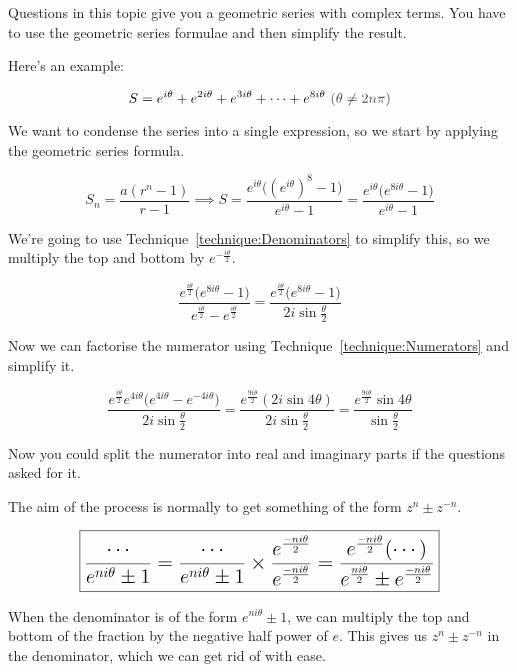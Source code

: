 \documentclass[../main.tex]{subfile}
\begin{document}

Questions in this topic give you a geometric series with complex terms. You have to use the geometric series formulae and then simplify the result.

Here's an example:

$$S = e^{i\theta} + e^{2i\theta} + e^{3i\theta} + \cdots + e^{8i\theta}\ \constraint{\theta \ne 2n\pi}$$

We want to condense the series into a single expression, so we start by applying the geometric series formula.

$$S_n = \dfrac{a(r^n - 1)}{r - 1}
\implies S = \frac{e^{i\theta} \big( (e^{i\theta})^8 - 1 \big)}{e^{i\theta} - 1}
= \frac{e^{i\theta} \big( e^{8i\theta} - 1 \big)}{e^{i\theta} - 1}$$

We're going to use Technique~\ref{technique:Denominators} to simplify this, so we multiply the top and bottom by $\displaystyle e^{-\frac{i\theta}{2}}$.

$$\frac{e^{\frac{i\theta}{2}} \big(e^{8i\theta} - 1\big)}{e^{\frac{i\theta}{2}} - e^{\frac{i\theta}{2}}}
= \frac{e^{\frac{i\theta}{2}} \big(e^{8i\theta} - 1\big)}{2i\sin \frac{\theta}{2}}$$

Now we can factorise the numerator using Technique~\ref{technique:Numerators} and simplify it.

$$\frac{e^{\frac{i\theta}{2}} e^{4i\theta} \big(e^{4i\theta} - e^{-4i\theta}\big)}{2i\sin \frac{\theta}{2}}
= \frac{e^{\frac{9i\theta}{2}} (2i\sin 4\theta)}{2i\sin \frac{\theta}{2}}
= \frac{e^{\frac{9i\theta}{2}} \sin 4\theta}{\sin \frac{\theta}{2}}$$

Now you could split the numerator into real and imaginary parts if the questions asked for it.


The aim of the process is normally to get something of the form $z^n \pm z^{-n}$.


$$\Large \boxed{\frac{\cdots}{e^{ni\theta} \pm 1}
= \frac{\cdots}{e^{ni\theta} \pm 1} \times \frac{e^\frac{-ni\theta}{2}}{e^\frac{-ni\theta}{2}}
= \frac{e^\frac{-ni\theta}{2} (\cdots)}{e^\frac{ni\theta}{2} \pm e^\frac{-ni\theta}{2}}}$$

When the denominator is of the form $\displaystyle e^{ni\theta} \pm 1$, we can multiply the top and bottom of the fraction by the negative half power of $e$. This gives us $z^n \pm z^{-n}$ in the denominator, which we can get rid of with ease.
\end{document}

